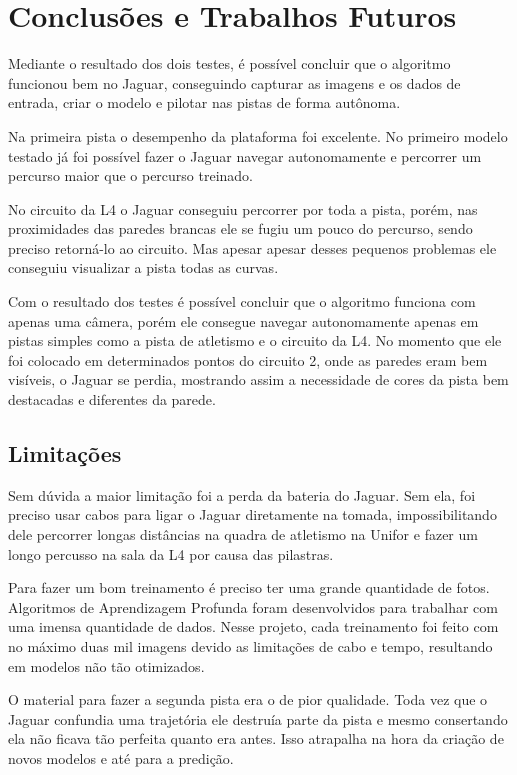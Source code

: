 \chapter{Conclusões e Trabalhos Futuros}
\label{chap:conclusoes-e-trabalhos-futuros}

Mediante o resultado dos dois testes, é possível concluir que o algoritmo funcionou bem no Jaguar, conseguindo capturar as imagens e os dados de entrada, criar o modelo e pilotar nas pistas de forma autônoma. 

Na primeira pista o desempenho da plataforma foi excelente. No primeiro modelo testado já foi possível fazer o Jaguar navegar autonomamente e percorrer um percurso maior que o percurso treinado.

No circuito da L4 o Jaguar conseguiu percorrer por toda a pista, porém, nas proximidades das paredes brancas ele se fugiu um pouco do percurso, sendo preciso retorná-lo ao circuito. Mas apesar apesar desses pequenos problemas ele conseguiu visualizar a pista todas as curvas.

Com o resultado dos testes é possível concluir que o algoritmo funciona com apenas uma câmera, porém ele consegue navegar autonomamente apenas em pistas simples como a pista de atletismo e o circuito da L4. No momento que ele foi colocado em determinados pontos do circuito 2, onde as paredes eram bem visíveis, o Jaguar se perdia, mostrando assim a necessidade de cores da pista bem destacadas e diferentes da parede.

\section{Limitações}
\label{sec:limitacoes}

Sem dúvida a maior limitação foi a perda da bateria do Jaguar. Sem ela, foi preciso usar cabos para ligar o Jaguar diretamente na tomada, impossibilitando dele percorrer longas distâncias na quadra de atletismo na Unifor e fazer um longo percusso na sala da L4 por causa das pilastras.

Para fazer um bom treinamento é preciso ter uma grande quantidade de fotos. Algoritmos de Aprendizagem Profunda foram desenvolvidos para trabalhar com uma imensa quantidade de dados. Nesse projeto, cada treinamento foi feito com no máximo duas mil imagens devido as limitações de cabo e tempo, resultando em modelos não tão otimizados.

O material para fazer a segunda pista era o de pior qualidade. Toda vez que o Jaguar confundia uma trajetória ele destruía parte da pista e mesmo consertando ela não ficava tão perfeita quanto era antes. Isso atrapalha na hora da criação de novos modelos e até para a predição.

